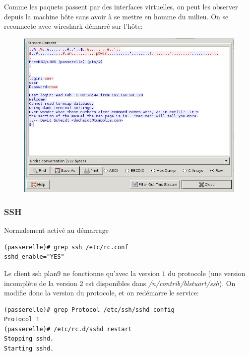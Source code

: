 \documentclass[a4paper]{article}
\begin{document}
Comme les paquets passent par des interfaces virtuelles, on
peut les observer depuis la machine hôte sans avoir à se
mettre en homme du milieu. On se reconnecte avec wireshark
démarré sur l'hôte:
\begin{figure}[!ht]
	\centering
	\includegraphics[scale=.5]{telnetsniff.png}
\end{figure}

\subsubsection{SSH}
Normalement activé au démarrage
\begin{verbatim}
(passerelle)# grep ssh /etc/rc.conf 
sshd_enable="YES"
\end{verbatim}

Le client ssh plan9 ne fonctionne qu'avec la version $1$ du
protocole (une version incomplète de la version $2$ est
disponibles dans \textit{/n/contrib/blstuart/ssh}). On modifie
donc la version du protocole, et on redémarre le service:
\begin{verbatim}
(passerelle)# grep Protocol /etc/ssh/sshd_config
Protocol 1
(passerelle)# /etc/rc.d/sshd restart
Stopping sshd.
Starting sshd.
\end{verbatim}
\end{document}
